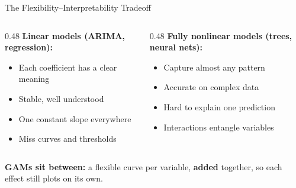 \documentclass[aspectratio=169, 11pt]{beamer}
\begin{document}
\begin{frame}{The Flexibility--Interpretability Tradeoff}
  \begin{columns}[T]
    \begin{column}{0.48\textwidth}
      \textbf{Linear models (ARIMA, regression):}
      {
      \begin{itemize}\small\itemsep0pt
        \item Each coefficient has a clear meaning
        \item Stable, well understood
      \end{itemize}}
      {
      \begin{itemize}\small\itemsep0pt
        \item One constant slope everywhere
        \item Miss curves and thresholds
      \end{itemize}}
    \end{column}
    \begin{column}{0.48\textwidth}
      \textbf{Fully nonlinear models (trees, neural nets):}
      {
      \begin{itemize}\small\itemsep0pt
        \item Capture almost any pattern
        \item Accurate on complex data
      \end{itemize}}
      {
      \begin{itemize}\small\itemsep0pt
        \item Hard to explain one prediction
        \item Interactions entangle variables
      \end{itemize}}
    \end{column}
  \end{columns}

  \vspace{0.3cm}
  \textbf{GAMs sit between:} a flexible curve per variable, \textbf{added} together, so
  each effect still plots on its own.
\end{frame}
\end{document}
